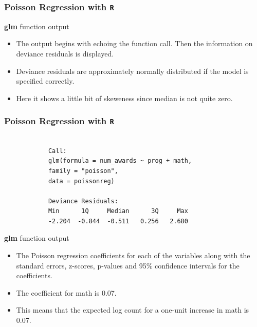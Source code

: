 \documentclass[00-GLMregslides.tex]{subfiles}
\begin{document}
\begin{frame}[fragile]

\frametitle{Poisson Regression with \texttt{R}}
\Large 
\textbf{glm} function output
\begin{itemize}
 \item The output begins with echoing the function call. Then the information on deviance residuals is displayed. 
 \item Deviance residuals are approximately normally distributed if the model is specified correctly.
 \item Here it shows a little bit of skeweness since median is not quite zero. 
\end{itemize}
\end{frame}
	\begin{frame}[fragile]
		\frametitle{Poisson Regression with \texttt{R}}
		
		\begin{framed}
			\begin{verbatim}
			
			Call:
			glm(formula = num_awards ~ prog + math, 
			family = "poisson", 
			data = poissonreg)
			
			Deviance Residuals: 
			Min      1Q     Median      3Q     Max  
			-2.204  -0.844  -0.511   0.256   2.680  
			\end{verbatim}
		\end{framed}
	\end{frame}
\begin{frame}
\Large 
\textbf{glm} function output
\begin{itemize}
\item The Poisson regression coefficients for each of the variables along with the standard errors, z-scores, p-values 
and 95\% confidence intervals for the coefficients. 
\item The coefficient for math is 0.07.
\item This means that the expected log count for a one-unit increase in math is 0.07. 
\end{itemize}
\end{frame}
\end{document}
